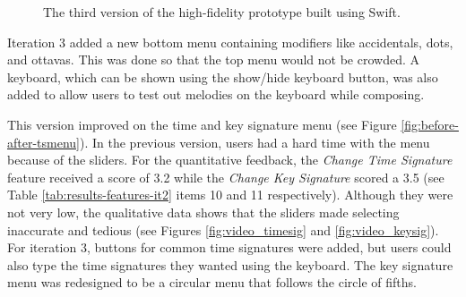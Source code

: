 				\begin{figure}[H]
					\centering
				    \caption{The third version of the high-fidelity prototype built using Swift.}
				    \label{fig:flow_it3}
				\end{figure} 

				Iteration 3 added a new bottom menu containing modifiers like accidentals, dots, and ottavas. This was done so that the top menu would not be crowded. A keyboard, which can be shown using the show/hide keyboard button, was also added to allow users to test out melodies on the keyboard while composing. 

				This version improved on the time and key signature menu (see Figure \ref{fig:before-after-tsmenu}). In the previous version, users had a hard time with the menu because of the sliders. For the quantitative feedback, the \textit{Change Time Signature} feature received a score of 3.2 while the \textit{Change Key Signature} scored a 3.5 (see Table \ref{tab:results-features-it2} items 10 and 11 respectively). Although they were not very low, the qualitative data shows that the sliders made selecting inaccurate and tedious (see Figures \ref{fig:video_timesig} and \ref{fig:video_keysig}). For iteration 3, buttons for common time signatures were added, but users could also type the time signatures they wanted using the keyboard. The key signature menu was redesigned to be a circular menu that follows the circle of fifths. 

